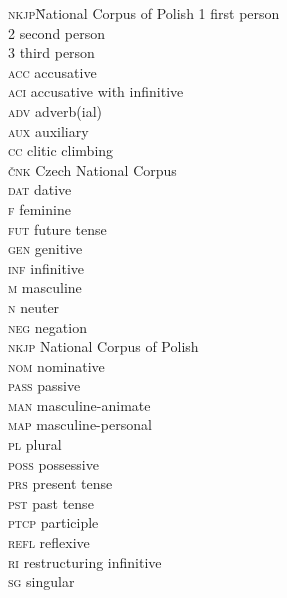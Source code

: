 \documentclass[output=paper,colorlinks,citecolor=brown]{langscibook}
\begin{document}
\begin{multicols}{2}
\begin{tabbing}
\textsc{nkjp}\hspace{.5em}\= National Corpus of Polish\kill
\textsc{1} \> first person\\
\textsc{2} \> second person\\
\textsc{3} \> third person\\
\textsc{acc} \> accusative\\
\textsc{aci} \> accusative with infinitive\\
\textsc{adv} \> adverb(ial)\\
\textsc{aux} \> auxiliary\\
\textsc{cc} \> clitic climbing\\
\textsc{čnk} \> Czech National Corpus\\
\textsc{dat} \> dative\\
\textsc{f} \> feminine\\
\textsc{fut} \> future tense\\
\textsc{gen} \> genitive\\
\textsc{inf} \> infinitive\\
\textsc{m} \> masculine\\
\textsc{n} \> neuter\\
\textsc{neg} \> negation\\
\textsc{nkjp} \> National Corpus of Polish\\
\textsc{nom} \> nominative\\
\textsc{pass} \> passive\\
\textsc{man} \> masculine-animate\\
\textsc{map} \> masculine-personal\\
\textsc{pl} \> plural\\
\textsc{poss} \> possessive\\
\textsc{prs} \> present tense\\
\textsc{pst} \> past tense\\
\textsc{ptcp} \> participle\\
\textsc{refl} \> reflexive\\
\textsc{ri} \> restructuring infinitive\\
\textsc{sg} \> singular
\end{tabbing}
\end{multicols}
\end{document}
